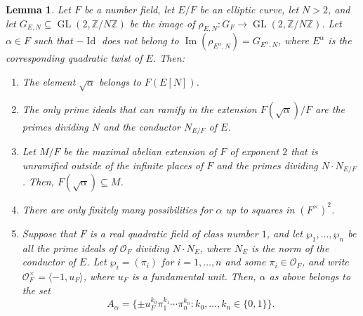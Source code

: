 \documentclass[11pt]{amsart}
\newtheorem{lemma}[defn]{Lemma}
\theoremstyle{definition}
\newcommand{\Z}{\mathbb Z}
\newcommand{\OF}{\mathcal{O}_F}
\newcommand{\GL}{\operatorname{GL}}
\begin{document}
\begin{lemma}\label{lem-whattwists}\label{lem-method}
    Let $F$ be a number field, let $E/F$ be an elliptic curve,  let $N> 2$, and let $G_{E,N}\subseteq \GL(2,\Z/N\Z)$ be the image of $\rho_{E,N}\colon G_F \to \GL(2,\Z/N\Z)$. Let $\alpha\in F$ such that $-\operatorname{Id}$ does not belong to $\operatorname{Im}(\rho_{E^\alpha,N})=G_{E^\alpha,N}$, where $E^\alpha$ is the corresponding quadratic twist of $E$. Then:
    \begin{enumerate}
        \item The element $\sqrt{\alpha}$ belongs to $F(E[N])$.
        \item The only prime ideals that can ramify in the extension $F(\sqrt{\alpha})/F$ are the primes dividing $N$ and the conductor $N_{E/F}$ of $E$.
        
        \item Let $M/F$ be the maximal abelian extension of $F$ of exponent $2$ that is unramified outside of the infinite places of $F$ and the primes dividing $N\cdot N_{E/F}$. Then, $F(\sqrt{\alpha})\subseteq M$.

        \item There are only finitely many possibilities for $\alpha$ up to squares in $(F^\times)^2$.

        \item Suppose that $F$ is a real quadratic field of class number $1$, and let $\wp_1,\ldots,\wp_n$ be all the prime ideals of $\OF$ dividing $N\cdot N_E$, where $N_E$ is the norm of the conductor of $E$. Let $\wp_i=(\pi_i)$ for $i=1,\ldots,n$ and some $\pi_i\in \OF$, and write $\OF^\times = \langle -1,u_F\rangle$, where $u_F$ is a fundamental unit. Then, $\alpha$ as above belongs to the set
        $$A_\alpha = \{\pm u_F^{k_0}\pi_1^{k_1}\cdots \pi_n^{k_n} : k_0,\ldots, k_n \in \{0,1\} \}.$$
    \end{enumerate}
\end{lemma}
\end{document}
